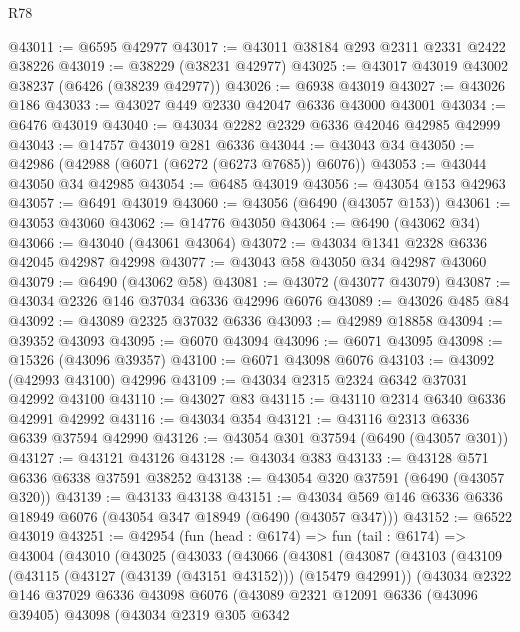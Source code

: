 \begin{lexlean}{R78}
\begin{coremodule}
@43011 := @6595 @42977
@43017 := @43011 @38184 @293 @2311 @2331 @2422 @38226
@43019 := @38229 (@38231 @42977)
@43025 := @43017 @43019 @43002 @38237 (@6426 (@38239 @42977))
@43026 := @6938 @43019
@43027 := @43026 @186
@43033 := @43027 @449 @2330 @42047 @6336 @43000 @43001
@43034 := @6476 @43019
@43040 := @43034 @2282 @2329 @6336 @42046 @42985 @42999
@43043 := @14757 @43019 @281 @6336
@43044 := @43043 @34
@43050 := @42986 (@42988 (@6071 (@6272 (@6273 @7685)) @6076))
@43053 := @43044 @43050 @34 @42985
@43054 := @6485 @43019
@43056 := @43054 @153 @42963
@43057 := @6491 @43019
@43060 := @43056 (@6490 (@43057 @153))
@43061 := @43053 @43060
@43062 := @14776 @43050
@43064 := @6490 (@43062 @34)
@43066 := @43040 (@43061 @43064)
@43072 := @43034 @1341 @2328 @6336 @42045 @42987 @42998
@43077 := @43043 @58 @43050 @34 @42987 @43060
@43079 := @6490 (@43062 @58)
@43081 := @43072 (@43077 @43079)
@43087 := @43034 @2326 @146 @37034 @6336 @42996 @6076
@43089 := @43026 @485 @84
@43092 := @43089 @2325 @37032 @6336
@43093 := @42989 @18858
@43094 := @39352 @43093
@43095 := @6070 @43094
@43096 := @6071 @43095
@43098 := @15326 (@43096 @39357)
@43100 := @6071 @43098 @6076
@43103 := @43092 (@42993 @43100) @42996
@43109 := @43034 @2315 @2324 @6342 @37031 @42992 @43100
@43110 := @43027 @83
@43115 := @43110 @2314 @6340 @6336 @42991 @42992
@43116 := @43034 @354
@43121 := @43116 @2313 @6336 @6339 @37594 @42990
@43126 := @43054 @301 @37594 (@6490 (@43057 @301))
@43127 := @43121 @43126
@43128 := @43034 @383
@43133 := @43128 @571 @6336 @6338 @37591 @38252
@43138 := @43054 @320 @37591 (@6490 (@43057 @320))
@43139 := @43133 @43138
@43151 := @43034 @569 @146 @6336 @6336 @18949 @6076 (@43054 @347 @18949 (@6490 (@43057 @347)))
@43152 := @6522 @43019
@43251 := @42954
    (fun (head : @6174) =>
    fun (tail : @6174) =>
    @43004
      (@43010
        (@43025
          (@43033
            (@43066
              (@43081
                (@43087
                  (@43103
                    (@43109
                      (@43115 (@43127 (@43139 (@43151 @43152))) (@15479 @42991))
                      (@43034
                        @2322
                        @146
                        @37029
                        @6336
                        @43098
                        @6076
                        (@43089
                          @2321
                          @12091
                          @6336
                          (@43096 @39405)
                          @43098
                          (@43034
                            @2319
                            @305
                            @6342

\end{coremodule}
\end{lexlean}
